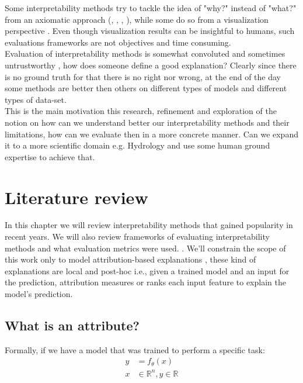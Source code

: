 \documentclass[12pt]{report}
\begin{document}
Some interpretability methods try to tackle the idea of "why?" instead of "what?" from an axiomatic approach (\cite{DBLP:journals/corr/SundararajanTY17}, \cite{DBLP:journals/corr/abs-2111-07668}, \cite{DBLP:journals/corr/MontavonSM17}, \cite{https://doi.org/10.48550/arxiv.1711.00867}),  while some do so from a visualization perspective \cite{DBLP:journals/corr/abs-1802-00614}. Even though visualization results can be insightful to humans, such evaluations frameworks are not objectives and time consuming.\\ 


Evaluation of interpretability methods is somewhat convoluted and sometimes untrustworthy \cite{DBLP:journals/corr/abs-1912-01451}, how does someone define a good explanation? Clearly since there is no ground truth for that there is no right nor wrong, at the end of the day some methods are better then others on different types of models and different types of data-set. \\ 

This is the main motivation this research,  refinement and exploration of the notion on how can we understand better our interpretability methods and their limitations, how can we evaluate then in a more concrete manner. Can we expand it to a more scientific domain e.g. Hydrology and use some human ground expertise to achieve that. 


\newpage

\chapter{Literature review} 

In this chapter we will review interpretability methods that gained popularity in recent years. We will also review frameworks of evaluating interpretability methods and what evaluation metrics were used. . We'll constrain the scope of this work only to model attribution-based explanations \cite{electronics10050593}, these kind of explanations are local and post-hoc i.e., given a trained model and an input for the prediction, attribution measures or ranks each input feature to explain the model's prediction. \\

\section{What is an attribute?}
Formally, if we have a model that was trained to perform a specific task:
\begin{align*}
	y & = f_{\theta}(x) \\
	x & \in \mathbb{R}^n, y \in \mathbb{R}
\end{align*}
\end{document}

